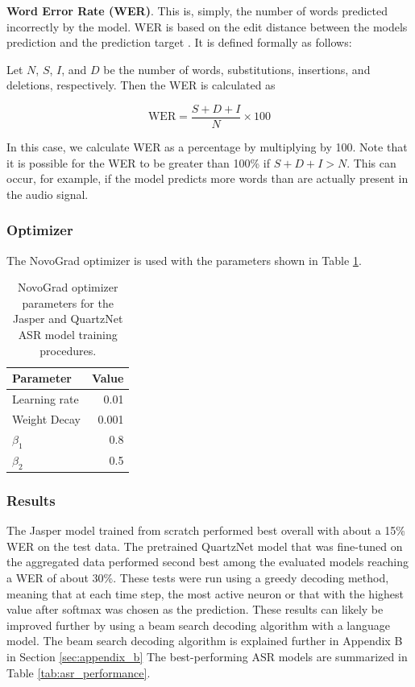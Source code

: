 \documentclass[12pt]{article}
\begin{document}
\textbf{Word Error Rate (WER)}. This is, simply, the number of words predicted incorrectly by the model. WER is based on the edit distance between the
models prediction and the prediction target \cite{hunt_figures_1990}. It is defined formally as follows:

Let $N$, $S$, $I$, and $D$ be the number of words, substitutions, insertions, and deletions, respectively. Then the WER is calculated as

\begin{equation}\label{eq:word_error_rate}
    \mbox{WER} = \frac{S + D + I}{N} \times 100
\end{equation}

\noindent
In this case, we calculate WER as a percentage by multiplying by 100. Note that it is possible for the WER to be greater than 100\% if
$S + D + I > N$. This can occur, for example, if the model predicts more words than are actually present in the audio signal.

\subsubsection{Optimizer}\label{sec:asr_optimizer}
The NovoGrad optimizer \cite{ginsburg_stochastic_2019} is used with the parameters shown in Table \ref{tab:novograd_params}.

\begin{table}[!t]
    \centering
    \begin{tabular}{l r}
        \toprule
        Parameter     & Value \\
        \midrule
        Learning rate & 0.01  \\
        Weight Decay  & 0.001 \\
        $\beta_1$     & 0.8   \\
        $\beta_2$     & 0.5   \\
        \bottomrule
    \end{tabular}
    \caption{NovoGrad optimizer parameters for the Jasper and QuartzNet ASR model training procedures.}
    \label{tab:novograd_params}
\end{table}


\subsubsection{Results}\label{sec:asr_results}
The Jasper model trained from scratch performed best overall with about a 15\% WER on the test data. The pretrained QuartzNet model that was
fine-tuned on the aggregated data performed second best among the evaluated models reaching a WER of about 30\%. These tests were run using a greedy
decoding method, meaning that at each time step, the most active neuron or that with the highest value after softmax was chosen as the prediction.
These results can likely be improved further by using a beam search decoding algorithm with a language model. The beam search decoding algorithm is
explained further in Appendix B in Section \ref{sec:appendix_b} The best-performing ASR models are summarized in Table \ref{tab:asr_performance}.
\end{document}
